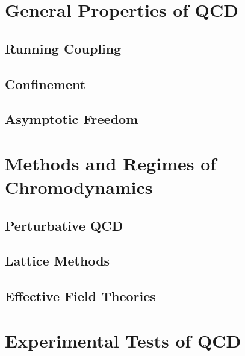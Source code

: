 \section{General Properties of QCD}
\subsection{Running Coupling}
\subsection{Confinement}
\subsection{Asymptotic Freedom}


\section{Methods and Regimes of Chromodynamics}
\subsection{Perturbative QCD}
\subsection{Lattice Methods}
\subsection{Effective Field Theories}

\section{Experimental Tests of QCD} 

